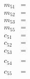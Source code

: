\documentclass{article}
\begin{document}
\begin{equation}
	\begin{aligned}
		m_{51} & =   \\
		m_{52} & =  \\
		m_{53} & =  \\
		m_{55} & =  \\
		c_{51} & =  \\
		c_{52} & =  \\
		c_{53} & =  \\
		&\quad \\
		c_{54} & =   \\
		&\quad  \\
		c_{55} & =   \\
		&\quad  \\
	\end{aligned}
\end{equation}
\end{document}
